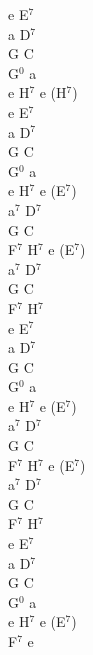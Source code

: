 \documentclass[a5paper, 10pt]{book}
\begin{document}
\begin{minipage}[t]{0.2\textwidth}
 e E$^7$\\
 a D$^7$\\
 G C\\
 G$^0$ a\\
 e H$^7$ e (H$^7$)\\

  e E$^7$\\
 a D$^7$\\
 G C\\
 G$^0$ a\\
 e H$^7$ e (E$^7$)\\
 
a$^7$ D$^7$\\
G C\\
 F$^7$ H$^7$ e (E$^7$)\\
 a$^7$ D$^7$\\
G C\\
 F$^7$ H$^7$\\
 
 e E$^7$\\
a D$^7$\\
 G C\\
G$^0$ a\\
 e H$^7$ e (E$^7$)\\
 
 a$^7$ D$^7$\\
G C\\
 F$^7$ H$^7$ e (E$^7$)\\
 a$^7$ D$^7$\\
 G C\\
 F$^7$ H$^7$\\

  e E$^7$\\
a D$^7$\\
 G C\\
G$^0$ a\\
 e H$^7$ e (E$^7$)\\

 F$^7$ e\\
\end{minipage}

\newpage
\end{document}
